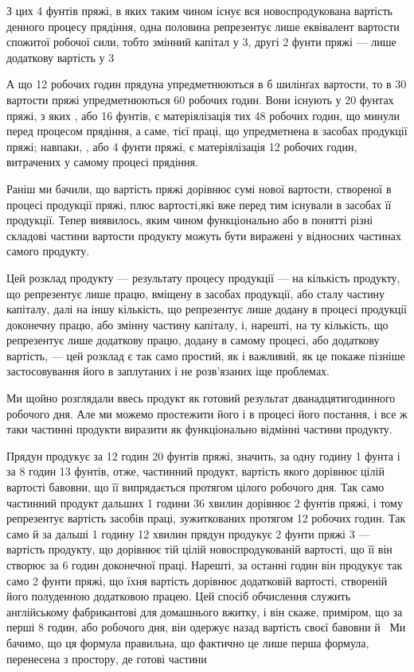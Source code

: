 
З цих 4 фунтів пряжі, в яких таким чином існує вся новоспродукована вартість денного процесу
прядіння, одна половина репрезентує лише еквівалент вартости спожитої робочої сили, тобто змінний капітал у 3, другі
2 фунти пряжі — лише додаткову вартість у 3

А що 12 робочих годин прядуна упредметнюються в б шилінґах вартости, то в 30 вартости пряжі
упредметнюються 60 робочих годин. Вони існують у 20 фунтах пряжі, з яких ,
або 16 фунтів, є матеріялізація тих 48 робочих годин, що минули перед процесом прядіння, а саме,
тієї праці, що упредметнена в засобах продукції пряжі; навпаки, , або 4 фунти пряжі, є
матеріялізація 12 робочих годин, витрачених у самому процесі прядіння.

Раніш ми бачили, що вартість пряжі дорівнює сумі нової вартости, створеної в процесі продукції
пряжі, плюс вартості,які вже перед тим існували в засобах її продукції. Тепер виявилось, яким чином функціонально або в
понятті різні складові
частини вартости продукту можуть бути виражені у відносних частинах самого продукту.

Цей розклад продукту — результату процесу продукції — на кількість продукту, що репрезентує лише
працю, вміщену в
засобах продукції, або сталу частину капіталу, далі на іншу кількість, що репрезентує лише додану в
процесі продукції доконечну працю, або змінну частину капіталу, і, нарешті, на ту
кількість, що репрезентує лише додаткову працю, додану в самому процесі, або додаткову вартість, —
цей розклад є так само простий, як і важливий, як це покаже пізніше застосовування його в заплутаних
і не розв’язаних іще проблемах.

Ми щойно розглядали ввесь продукт як готовий результат дванадцятигодинного робочого дня. Але ми
можемо простежити
його і в процесі його постання, і все ж таки частинні продукти виразити як функціонально відмінні
частини продукту.

Прядун продукує за 12 годин 20 фунтів пряжі, значить, за одну годину 1 фунта і за 8 годин 13
фунтів, отже, частинний
продукт, вартість якого дорівнює цілій вартості бавовни, що її випрядається протягом цілого робочого
дня. Так само частинний продукт дальших 1 години 36 хвилин дорівнює 2 фунтів пряжі,
і тому репрезентує вартість засобів праці, зужиткованих протягом 12 робочих годин. Так само й за
дальші 1 годину 12 хвилин
прядун продукує 2 фунти пряжі \deq{} 3 — вартість продукту, що дорівнює тій цілій
новоспродукованій вартості, що її він створює за 6 годин доконечної праці. Нарешті, за останні 
годин він продукує так само 2 фунти пряжі, що їхня вартість дорівнює додатковій вартості, створеній
його полуденною додатковою працею. Цей спосіб обчислення служить англійському фабрикантові для домашнього вжитку, і він скаже,
приміром, що за перші 8 годин, або  робочого дня, він одержує назад вартість своєї бавовни
й~ Ми бачимо, що ця формула правильна, що фактично це лише перша формула, перенесена з
простору, де готові частини
\parbreak{}  %
